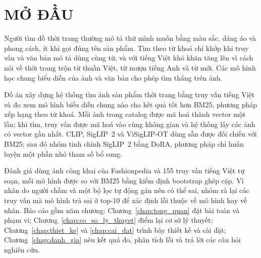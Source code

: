 \chapter*{MỞ ĐẦU}

Người tìm đồ thời trang thường mô tả thứ mình muốn bằng màu sắc, dáng áo và phong cách, ít khi gọi đúng tên sản phẩm. Tìm theo từ khoá chỉ khớp khi truy vấn và văn bản mô tả dùng cùng từ, và với tiếng Việt khó khăn tăng lên vì cách nói về thời trang trộn từ thuần Việt, từ mượn tiếng Anh và từ mới. Các mô hình học chung biểu diễn của ảnh và văn bản cho phép tìm thẳng trên ảnh.

Đồ án xây dựng hệ thống tìm ảnh sản phẩm thời trang bằng truy vấn tiếng Việt và đo xem mô hình biểu diễn chung nào cho kết quả tốt hơn BM25, phương pháp xếp hạng theo từ khoá. Mỗi ảnh trong catalog được mã hoá thành vector một lần; khi tìm, truy vấn được mã hoá vào cùng không gian và hệ thống lấy các ảnh có vector gần nhất. CLIP, SigLIP~2 và ViSigLIP-OT dùng sẵn được đối chiếu với BM25; sau đó nhóm tinh chỉnh SigLIP~2 bằng DoRA, phương pháp chỉ huấn luyện một phần nhỏ tham số bổ sung.

Đánh giá dùng ảnh công khai của Fashionpedia và 155 truy vấn tiếng Việt tự soạn, mỗi mô hình được so với BM25 bằng kiểm định bootstrap ghép cặp. Vì nhãn do người chấm và một bộ lọc tự động gán nên có thể sai, nhóm rà lại các truy vấn mà mô hình trả sai ở top-10 để xác định lỗi thuộc về mô hình hay về nhãn. Báo cáo gồm năm chương: Chương~\ref{chap:tong_quan} đặt bài toán và phạm vi; Chương~\ref{chap:co_so_ly_thuyet} điểm lại cơ sở lý thuyết; Chương~\ref{chap:thiet_ke} và \ref{chap:cai_dat} trình bày thiết kế và cài đặt; Chương~\ref{chap:danh_gia} nêu kết quả đo, phân tích lỗi và trả lời các câu hỏi nghiên cứu.
